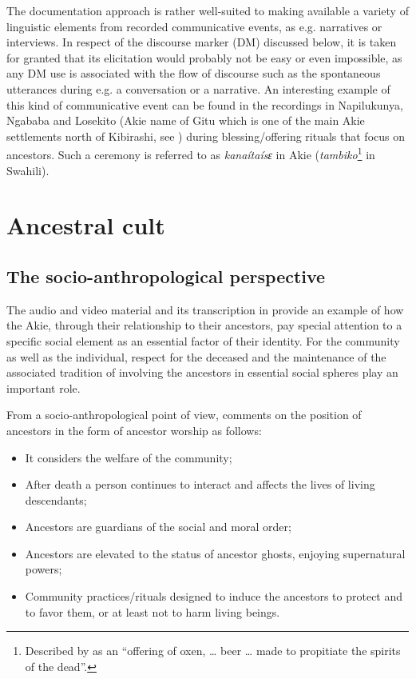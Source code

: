 \documentclass[output=paper,colorlinks,citecolor=brown]{langscibook}
\begin{document}
The documentation approach is rather well-suited to making available a variety of linguistic elements from recorded communicative events, as e.g. narratives or interviews. In respect of the discourse marker (DM) discussed below, it is taken for granted that its elicitation would probably not be easy or even impossible, as any DM use is associated with the flow of discourse such as the spontaneous utterances during e.g. a conversation or a narrative. An interesting example of this kind of communicative event can be found in the recordings in Napilukunya, Ngababa and Losekito (Akie name of Gitu which is one of the main Akie settlements north of Kibirashi, see ) during blessing/offering rituals that focus on  ancestors. Such a ceremony is referred to as \textit{kanaítaísɛ} in Akie (\textit{tambiko}\footnote{Described by \citet[449]{Johnson1939} as an “offering of oxen, … beer … made to propitiate the spirits of the dead”.} in Swahili). 

\section{Ancestral cult}\label{sec:legere:3}

\subsection{The socio-anthropological perspective}\label{sec:legere:3.1}

The audio and video material and its transcription in  provide an example of how the Akie, through their relationship to their ancestors, pay special attention to a specific social element as an essential factor of their identity. For the community as well as the individual, respect for the deceased and the maintenance of the associated tradition of involving the ancestors in essential social spheres play an important role. 

From a socio-anthropological point of view, \citet[364]{Ferraro2005} comments on the position of ancestors in the form of ancestor worship as follows:

\begin{itemize}
    \item It considers the welfare of the community;
    \item After death a person continues to interact and affects the lives of living descendants;
    \item Ancestors are guardians of the social and moral order;
    \item Ancestors are elevated to the status of ancestor ghosts, enjoying supernatural powers;
    \item Community practices/rituals designed to induce the ancestors to protect and to favor them, or at least not to harm living beings.
\end{itemize}
\end{document}
